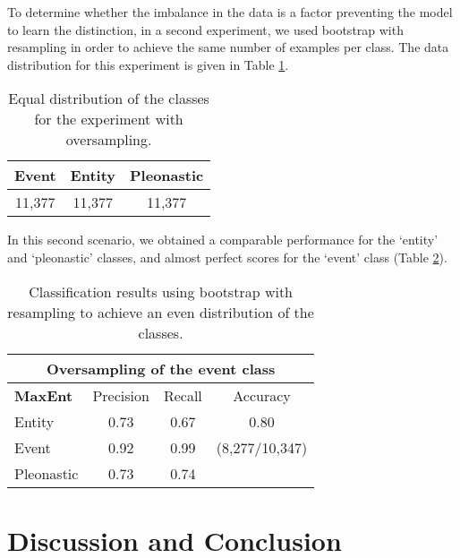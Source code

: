 \documentclass[10pt, a4paper]{article}
\begin{document}

To determine whether the imbalance in the data is a factor preventing the model 
to learn the distinction, in a second experiment, we used bootstrap with resampling in order to achieve the same number of examples per class. The data distribution for this experiment is given in Table \ref{tab:resamplingdata}.

\begin{table}[h!]\centering
\begin{tabular}{ccc}
\toprule
\textbf{Event} & \textbf{Entity} & \textbf{Pleonastic} \\
\midrule
11,377 & 11,377 & 11,377 \\
\bottomrule
\end{tabular}
\caption{Equal distribution of the classes for the experiment with 
oversampling.}\label{tab:resamplingdata}
\end{table}

In this second scenario, we obtained a comparable performance for the `entity' and `pleonastic' classes, and almost perfect scores for the `event' class (Table \ref{tab:maxentoversampling}). 

\begin{center} \begin{table}[h!] \begin{tabular}{lccc}
\multicolumn{4}{c}{\textbf{Oversampling of the event class}}\\ 
\toprule
\textbf{MaxEnt}& Precision & Recall & Accuracy \\ 
\midrule 
 Entity & 0.73 &0.67& 0.80 \\ 
 Event & 0.92 & 0.99 & (8,277/10,347) \\ 
  Pleonastic &  0.73 & 0.74 & \\
\bottomrule 
\end{tabular} 
\caption{Classification results using bootstrap with 
resampling to achieve an even distribution of the classes.}\label{tab:maxentoversampling}
\end{table}
\end{center}





\section{Discussion and Conclusion}
\end{document}
